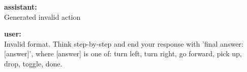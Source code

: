 \documentclass[11pt,a4paper]{article}
\begin{document}
\begin{tcolorbox}
  \begin{tcolorbox}[
    enhanced,
    colback=blue!5,
    colframe=blue!50,
    boxrule=0.5pt,
    arc=2pt,
    outer arc=2pt,
    top=2pt,
    bottom=2pt,
    left=4pt,
    right=4pt,
    boxsep=2pt
  ]
    \textbf{assistant:}\\[4pt]
    Generated invalid action
  \end{tcolorbox}

  \begin{tcolorbox}[
    enhanced,
    colback=green!5,
    colframe=green!50!black,
    boxrule=0.5pt,
    arc=2pt,
    outer arc=2pt,
    top=2pt,
    bottom=2pt,
    left=4pt,
    right=4pt,
    boxsep=2pt
  ]
    \textbf{user:}\\[4pt]
    Invalid format. Think step-by-step and end your response with 
    'final answer: [answer]', where [answer] is one of:
    turn left, turn right, go forward, pick up, drop, toggle, done.
  \end{tcolorbox}

\end{tcolorbox}

\newpage
\end{document}
